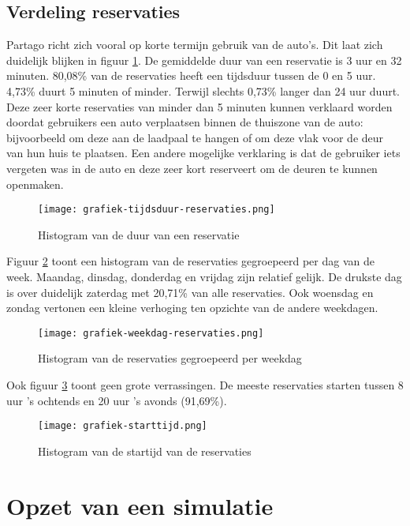 \subsection{Verdeling reservaties}
Partago richt zich vooral op korte termijn gebruik van de auto's. Dit laat zich duidelijk blijken in figuur \ref{grafiek:gebruiksduur}.
De gemiddelde duur van een reservatie is 3 uur en 32 minuten. 80,08\% van de reservaties heeft een tijdsduur tussen de 0 en 5 uur. 4,73\% duurt 5 minuten of minder. Terwijl slechts 0,73\% langer dan 24 uur duurt. Deze zeer korte reservaties van minder dan 5 minuten kunnen verklaard worden doordat gebruikers een auto verplaatsen binnen de thuiszone van de auto: bijvoorbeeld om deze aan de laadpaal te hangen of om deze vlak voor de deur van hun huis te plaatsen. Een andere mogelijke verklaring is dat de gebruiker iets vergeten was in de auto en deze zeer kort reserveert om de deuren te kunnen openmaken.  
\begin{figure}[p]
	\texttt{[image: grafiek-tijdsduur-reservaties.png]}
	\caption[Histogram van de duur van een reservatie]{Histogram van de duur van een reservatie}
	\label{grafiek:gebruiksduur}
\end{figure}
Figuur \ref{grafiek:weekdag} toont een histogram van de reservaties gegroepeerd per dag van de week. Maandag, dinsdag, donderdag en vrijdag zijn relatief gelijk. De drukste dag is over duidelijk zaterdag met 20,71\% van alle reservaties. Ook woensdag en zondag vertonen een kleine verhoging ten opzichte van de andere weekdagen.
\begin{figure}[p]
	\texttt{[image: grafiek-weekdag-reservaties.png]}
	\caption[Histogram van de reservaties gegroepeerd per weekdag]{Histogram van de reservaties gegroepeerd per weekdag}
	\label{grafiek:weekdag}
\end{figure}
Ook figuur \ref{grafiek:starttijd} toont geen grote verrassingen. De meeste reservaties starten tussen 8 uur 's ochtends en 20 uur 's avonds (91,69\%).
\begin{figure}[p]
	\texttt{[image: grafiek-starttijd.png]}
	\caption[Histogram van de startijd van de reservaties]{Histogram van de startijd van de reservaties}
	\label{grafiek:starttijd}
\end{figure}


\section{Opzet van een simulatie} \label{opzet-simulatie}
